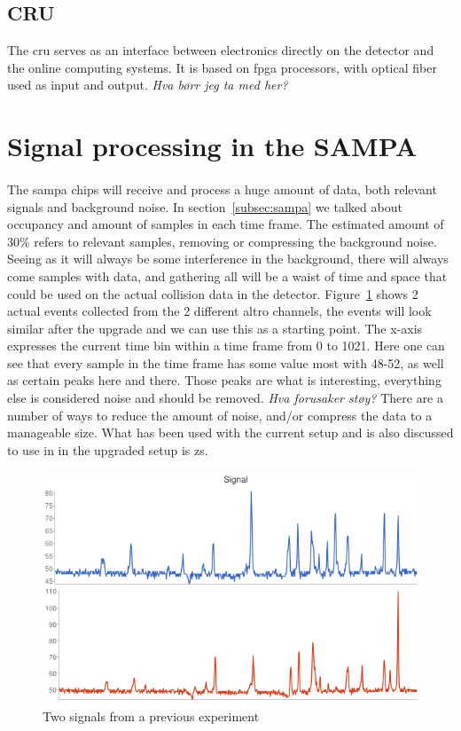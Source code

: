 \documentclass[a4paper]{report}
\begin{document}
\subsection{CRU}
The \gls{cru} serves as an interface between electronics directly on the detector and the online computing systems.
It is based on \gls{fpga} processors, with optical fiber used as input and output. %
\textit{Hva børr jeg ta med her?}

\section{Signal processing in the SAMPA}
\paragraph{}
The \gls{sampa} chips will receive and process a huge amount of data, both relevant signals and background noise.
In section~\ref{subsec:sampa} we talked about occupancy and amount of samples in each time frame.
The estimated amount of 30\% refers to relevant samples, removing or compressing the background noise.
Seeing as it will always be some interference in the background, there will always come samples with data, and gathering all will be a waist of time and space that could be used on the actual collision data in the detector.
Figure~\ref{fig:signal} shows 2 actual events collected from the 2 different \gls{altro} channels, the events will look similar after the upgrade and we can use this as a starting point.
The x-axis expresses the current time bin within a time frame from 0 to 1021.
Here one can see that every sample in the time frame has some value most with 48-52, as well as certain peaks here and there.
Those peaks are what is interesting, everything else is considered noise and should be removed.
\textit{Hva forusaker støy?}
There are a number of ways to reduce the amount of noise, and/or compress the data to a manageable size.
What has been used with the current setup and is also discussed to use in in the upgraded setup is \gls{zs}.

\begin{figure}[h!]
	\centering
		\includegraphics[width=1.0\textwidth]{images/signal.png}
		\caption{Two signals from a previous experiment}
		\label{fig:signal}
\end{figure}
\end{document}
